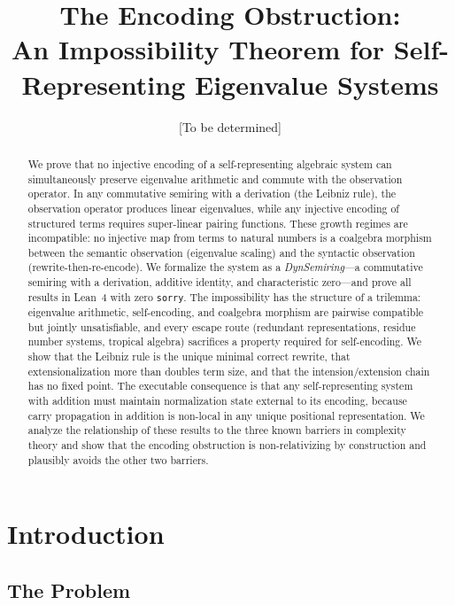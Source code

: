 \documentclass[11pt,a4paper]{article}
\title{\textbf{The Encoding Obstruction:}\\ An Impossibility Theorem for Self-Representing Eigenvalue Systems}
\author{[To be determined]}
\date{}
\theoremstyle{definition}
\theoremstyle{remark}
\begin{document}
\maketitle

\begin{abstract}
We prove that no injective encoding of a self-representing algebraic system
can simultaneously preserve eigenvalue arithmetic and commute with the
observation operator. In any commutative semiring with a derivation (the
Leibniz rule), the observation operator produces linear eigenvalues, while
any injective encoding of structured terms requires super-linear pairing
functions. These growth regimes are incompatible: no injective map from
terms to natural numbers is a coalgebra morphism between the semantic
observation (eigenvalue scaling) and the syntactic observation
(rewrite-then-re-encode). We formalize the system as a
\emph{DynSemiring}---a commutative semiring with a derivation, additive
identity, and characteristic zero---and prove all results in Lean~4 with
zero \texttt{sorry}. The impossibility has the structure of a trilemma:
eigenvalue arithmetic, self-encoding, and coalgebra morphism are pairwise
compatible but jointly unsatisfiable, and every escape route (redundant
representations, residue number systems, tropical algebra) sacrifices a
property required for self-encoding. We show that the Leibniz rule is the
unique minimal correct rewrite, that extensionalization more than doubles
term size, and that the intension/extension chain has no fixed point. The
executable consequence is that any self-representing system with addition
must maintain normalization state external to its encoding, because carry
propagation in addition is non-local in any unique positional
representation. We analyze the relationship of these results to the three
known barriers in complexity theory and show that the encoding obstruction
is non-relativizing by construction and plausibly avoids the other two
barriers.
\end{abstract}

\tableofcontents

\section{Introduction}
\label{sec:intro}

\subsection{The Problem}
\end{document}
